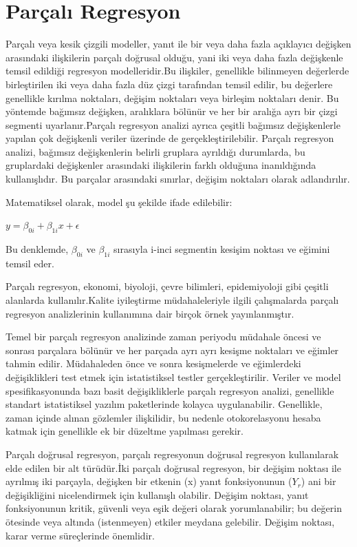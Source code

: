 \documentclass[12pt,twoside]{deuthesis}
\begin{document}
\hypertarget{paruxe7alux131-regresyon}{%
\section{Parçalı Regresyon}\label{paruxe7alux131-regresyon}}

Parçalı veya kesik çizgili modeller, yanıt ile bir veya daha fazla açıklayıcı değişken arasındaki ilişkilerin parçalı doğrusal olduğu, yani iki veya daha fazla değişkenle temsil edildiği regresyon modelleridir.Bu ilişkiler, genellikle bilinmeyen değerlerde birleştirilen iki veya daha fazla düz çizgi tarafından temsil edilir, bu değerlere genellikle kırılma noktaları, değişim noktaları veya birleşim noktaları denir. Bu yöntemde bağımsız değişken, aralıklara bölünür ve her bir aralığa ayrı bir çizgi segmenti uyarlanır.Parçalı regresyon analizi ayrıca çeşitli bağımsız değişkenlerle yapılan çok değişkenli veriler üzerinde de gerçekleştirilebilir. Parçalı regresyon analizi, bağımsız değişkenlerin belirli gruplara ayrıldığı durumlarda, bu gruplardaki değişkenler arasındaki ilişkilerin farklı olduğuna inanıldığında kullanışlıdır. Bu parçalar arasındaki sınırlar, değişim noktaları olarak adlandırılır.

Matematiksel olarak, model şu şekilde ifade edilebilir:

\(y = \beta_{0i} + \beta_{1i} x + \epsilon\)

Bu denklemde, \(\beta_{0i}\) ve \(\beta_{1i}\) sırasıyla i-inci segmentin kesişim noktası ve eğimini temsil eder.

Parçalı regresyon, ekonomi, biyoloji, çevre bilimleri, epidemiyoloji gibi çeşitli alanlarda kullanılır.Kalite iyileştirme müdahaleleriyle ilgili çalışmalarda parçalı regresyon analizlerinin kullanımına dair birçok örnek yayınlanmıştır.

Temel bir parçalı regresyon analizinde zaman periyodu müdahale öncesi ve sonrası parçalara bölünür ve her parçada ayrı ayrı kesişme noktaları ve eğimler tahmin edilir. Müdahaleden önce ve sonra kesişmelerde ve eğimlerdeki değişiklikleri test etmek için istatistiksel testler gerçekleştirilir. Veriler ve model spesifikasyonunda bazı basit değişikliklerle parçalı regresyon analizi, genellikle standart istatistiksel yazılım paketlerinde kolayca uygulanabilir. Genellikle, zaman içinde alınan gözlemler ilişkilidir, bu nedenle otokorelasyonu hesaba katmak için genellikle ek bir düzeltme yapılması gerekir.

Parçalı doğrusal regresyon, parçalı regresyonun doğrusal regresyon kullanılarak elde edilen bir alt türüdür.İki parçalı doğrusal regresyon, bir değişim noktası ile ayrılmış iki parçayla, değişken bir etkenin (x) yanıt fonksiyonunun (\(Y_{r}\)) ani bir değişikliğini nicelendirmek için kullanışlı olabilir. Değişim noktası, yanıt fonksiyonunun kritik, güvenli veya eşik değeri olarak yorumlanabilir; bu değerin ötesinde veya altında (istenmeyen) etkiler meydana gelebilir. Değişim noktası, karar verme süreçlerinde önemlidir.
\end{document}
